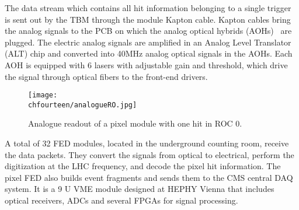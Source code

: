 The data stream which contains all hit information belonging to a single trigger is sent out by the TBM through the module Kapton cable.
Kapton cables bring the analog signals to the PCB on which the analog optical hybrids (AOHs)~\cite{1221923} are plugged.
The electric analog signals are amplified in an Analog Level Translator (ALT) chip and converted into 40\unit{MHz} analog optical signals in the AOHs.
Each AOH is equipped with 6 lasers with adjustable gain and threshold, which drive the signal through optical fibers to the front-end drivers.

\begin{figure}[!htb]
 \begin{center}
 \texttt{[image: \\chfourteen/analogueRO.jpg]}
 \end{center}
 \caption{Analogue readout of a pixel module with one hit in ROC 0.}
 \label{fig:ModuleReadout}
\end{figure}

A total of 32 FED modules, located in the underground counting room, receive the data packets.
They convert the signals from optical to electrical, perform the digitization at the LHC frequency, and decode the pixel hit information.
The pixel FED also builds event fragments and sends them to the CMS central DAQ system.
It is a 9 U VME module designed at HEPHY Vienna that includes optical receivers, ADCs and several FPGAs for signal processing.

